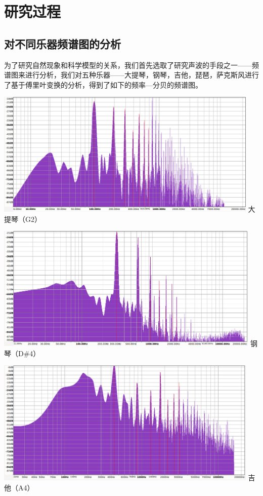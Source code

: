 \chapter{研究过程}
\section{对不同乐器频谱图的分析}
为了研究自然现象和科学模型的关系，我们首先选取了研究声波的手段之一——频谱图来进行分析，我们对五种乐器——大提琴，钢琴，吉他，琵琶，萨克斯风进行了基于傅里叶变换的分析，得到了如下的频率—分贝的频谱图。
\begin{center}
    \vspace{1cm}
    \includegraphics[height=6cm]{cello(G2).jpg}
    \vspace{3mm}
    大提琴（G2）
\end{center}
\begin{center}
    \includegraphics[height=6cm]{piano(D4sharp).jpg}
    \vspace{3mm}
    钢琴（D\#4）
    \vspace{2cm}
\end{center}
\begin{center}
    \includegraphics[height=6cm]{guitar(A4).jpg}
    \vspace{3mm}
    吉他（A4）
\end{center}
